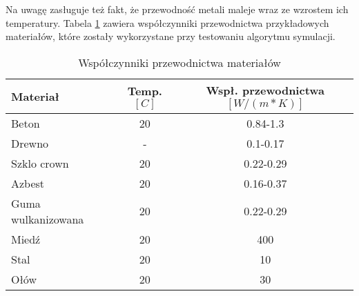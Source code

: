 Na uwagę zasługuje też fakt, że przewodność metali maleje wraz ze wzrostem ich temperatury.
Tabela \ref {przewodnictwa} zawiera współczynniki przewodnictwa przykładowych materiałów, które zostały wykorzystane przy
testowaniu algorytmu symulacji.
\begin{table}
\begin {center}
\begin{tabular} {|l | c | c|}
\hline
Materiał & Temp. $[C]$ & Wspł. przewodnictwa $[W/(m*K)]$ \\ \hline
Beton & 20 & 0.84-1.3  \\ \hline
Drewno & - & 0.1-0.17  \\ \hline
Szklo crown & 20 & 0.22-0.29  \\ \hline
Azbest & 20 & 0.16-0.37 \\ \hline
Guma wulkanizowana & 20 & 0.22-0.29 \\ \hline
Miedź & 20 & 400 \\ \hline
Stal & 20 & 10 \\ \hline
Ołów & 20 & 30 \\ \hline
\hline
\end {tabular}
\caption{Współczynniki przewodnictwa materiałów}
\label{przewodnictwa}
\end{center}
\end {table}
